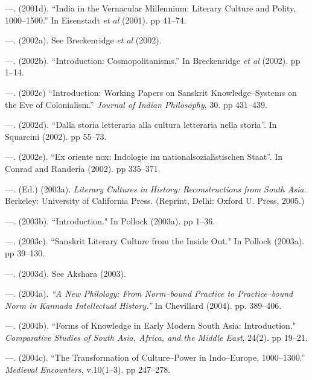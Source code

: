 \begin{thebibliography}{99}
 \item —. (2001d). “India in the Vernacular Millennium: Literary Culture and Polity, 1000–1500.” In Eisenstadt \textit{et al} (2001). pp 41–74.

 \item —. (2002a). See Breckenridge \textit{et al} (2002).

 \item —. (2002b). “Introduction: Cosmopolitanisms.” In Breckenridge \textit{et al} (2002). pp 1–14.

 \item —. (2002c) “Introduction: Working Papers on Sanskrit Knowledge–Systems on the Eve of Colonialism.” \textit{Journal of Indian Philosophy}, 30. pp 431–439.

 \item —. (2002d). “Dalla storia letteraria alla cultura letteraria nella storia”. In Squarcini (2002). pp 55–73.

 \item —. (2002e). “Ex oriente nox: Indologie im nationalsozialistischen Staat”. In Conrad and Randeria (2002). pp 335–371.

 \item —. (Ed.) (2003a). \textit{Literary Cultures in History: Reconstructions from South Asia. }Berkeley: University of California Press. (Reprint, Delhi: Oxford U. Press, 2005.)

 \item —. (2003b). “Introduction." In Pollock (2003a). pp 1–36.

 \item —. (2003c). “Sanskrit Literary Culture from the Inside Out." In Pollock (2003a). pp 39–130.

 \item —. (2003d). See Akshara (2003).

 \item —. (2004a).\textit{ “A New Philology: From Norm–bound Practice to Practice–bound Norm in Kannada Intellectual History.” }In Chevillard (2004). pp. 389–406.

 \item —. (2004b). “Forms of Knowledge in Early Modern South Asia: Introduction." \textit{Comparative Studies of South Asia, Africa, and the Middle East}, 24(2). pp 19–21.

 \item —. (2004c). “The Transformation of Culture–Power in Indo–Europe, 1000–1300.” \textit{Medieval Encounters}, v.10(1–3). pp 247–278.


\end{thebibliography}
